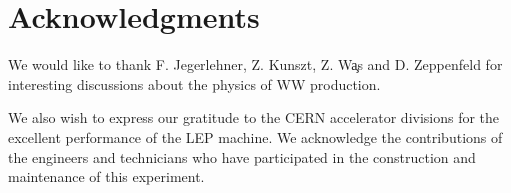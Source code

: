 \documentclass[12pt,a4paper,dvips]{article}
\begin{document}
%
%
\section*{Acknowledgments}

We would like to thank F. Jegerlehner, Z. Kunszt, 
Z. W\c{a}s and D. Zeppenfeld for interesting discussions 
about the physics of WW production. 

We also wish to 
express our gratitude to the CERN accelerator divisions for
the excellent performance of the LEP machine. 
We acknowledge the contributions of the engineers 
and technicians who have participated in the construction 
and maintenance of this experiment.  
\newpage
%
%

\end{document}
